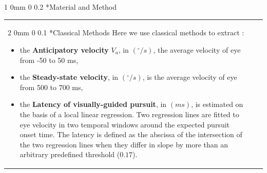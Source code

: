 \documentclass[profile,final,english, draft]{sciposter}%
\makeatletter
\renewcommand{\section}{\@startsection
        {section}%
        {1}%
        {0mm}%
        {0\baselineskip}%
        {0.2\baselineskip}%
        {\LARGE\color{red}\bfseries}}%
\renewcommand{\subsection}{\@startsection
        {subsection}%
        {2}%
        {0mm}%
        {0\baselineskip}%
        {0.1\baselineskip}%
        {\Large\color[rgb]{0.4,0,0}\bfseries}}%
\newcommand{\spacefig}{1.\baselineskip}
\makeatother
\begin{document}
\vspace{.3\baselineskip}

\section*{Material and Method}
\vspace{-.7\baselineskip}

\begin{tabular}{p{}m{}p{}}
\subsection*{Classical Methods}
Here we use classical methods to extract :
\begin{itemize}\setlength{\itemsep}{0ex}
\item the \textbf{Anticipatory velocity} $V_a$, in $(^\circ/s)$, the average velocity of eye from -50 to 50 ms,
\item the \textbf{Steady-state velocity}, in $(^\circ/s)$, is the average velocity of eye from 500 to 700 ms,
\item the \textbf{Latency of visually-guided pursuit}, in $(ms)$,  is estimated on the basis of a local linear regression. Two regression lines are fitted to eye velocity in two temporal windows around the expected pursuit onset time. The latency is defined as the abscissa of the intersection of the two regression lines when they differ in slope by more than an arbitrary predefined threshold ($0.17$).
\end{itemize}


&&

\end{tabular}
\end{document}
